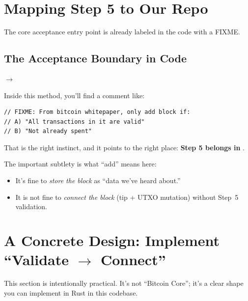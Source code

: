 \section{Mapping Step 5 to Our Repo}
\label{sec:ch10-mapping-to-repo}

The core acceptance entry point is already labeled in the code with a FIXME.

\subsection{The Acceptance Boundary in Code}
\label{sec:ch10-acceptance-boundary}

 $\to$ 

Inside this method, you'll find a comment like:

\begin{verbatim}
// FIXME: From bitcoin whitepaper, only add block if:
// A) "All transactions in it are valid"
// B) "Not already spent"
\end{verbatim}

That is the right instinct, and it points to the right place: \textbf{Step 5 belongs in }.

The important subtlety is what ``add'' means here:

\begin{itemize}
  \item It's fine to \emph{store the block} as ``data we've heard about.''
  \item It is not fine to \emph{connect the block} (tip + UTXO mutation) without Step~5 validation.
\end{itemize}

\section{A Concrete Design: Implement ``Validate \texorpdfstring{$\to$}{→} Connect''}
\label{sec:ch10-concrete-design}

This section is intentionally practical. It's not ``Bitcoin Core''; it's a clear shape you can implement in Rust in this codebase.

